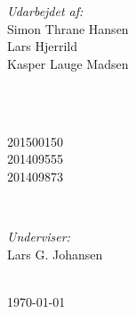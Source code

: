 \begin{titlepage}
		\begin{minipage}{0.4\textwidth}
			\begin{flushleft} \large
				\emph{Udarbejdet af:}\\
				Simon Thrane Hansen \\%
				Lars Hjerrild \\%
				Kasper Lauge Madsen
			\end{flushleft}
		\end{minipage}
		~
		\begin{minipage}{0.4\textwidth}
			\begin{flushright} \large
				\ \\
				201500150 \\%
				201409555\\ 	
				201409873 
			\end{flushright}
		\end{minipage}\\[1.0cm]
		
		
		\begin{minipage}{0.3\textwidth}
			\begin{center} \large
				\emph{Underviser:} \\
				Lars G. Johansen	
			\end{center}
		\end{minipage}\\[0.5cm]
	
		
		
		{\large \today}\\[2cm] %
		
	
		
\end{titlepage}
